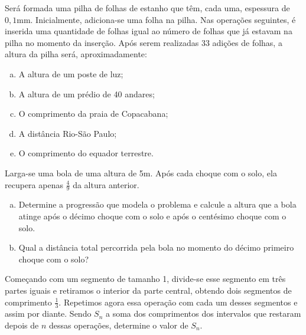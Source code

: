 \begin{exercise}
Será formada uma pilha de folhas de estanho que têm, cada uma,
espessura de $0,1$mm. Inicialmente, adiciona-se uma folha na pilha.
Nas operações seguintes, é inserida uma quantidade de folhas igual
ao número de folhas que já estavam na pilha no momento da inserção.
Após serem realizadas 33 adições de folhas, a altura da pilha será,
aproximadamente:
\begin{enumerate}[a.]
  \item A altura de um poste de luz;
  \item A altura de um prédio de 40 andares;
  \item O comprimento da praia de Copacabana;
  \item A distância Rio-São Paulo;
  \item O comprimento do equador terrestre.
\end{enumerate}
\end{exercise}

\begin{exercise}
    Larga-se uma bola de uma altura de 5m. Após cada choque com o
solo, ela recupera apenas $\frac 4 9 $ da altura anterior. 
%
\begin{enumerate}[a.]
    \item Determine a progressão que modela o problema e calcule 
    a altura que a bola atinge após o décimo choque com o solo
    e após o centésimo choque com o solo.
    \item Qual a distância total percorrida pela bola no momento 
    do décimo primeiro choque com o solo? 
\end{enumerate}
\end{exercise}

\begin{exercise}
    Começando com um segmento de tamanho 1, divide-se esse segmento
em três partes iguais e retiramos o interior da parte central,
obtendo dois segmentos de comprimento $\frac 1 3$. Repetimos agora
essa operação com cada um desses segmentos e assim por diante. Sendo
$S_n$ a soma dos comprimentos dos intervalos que restaram depois de
$n$ dessas operações, determine o valor de $S_n$.
\end{exercise}


